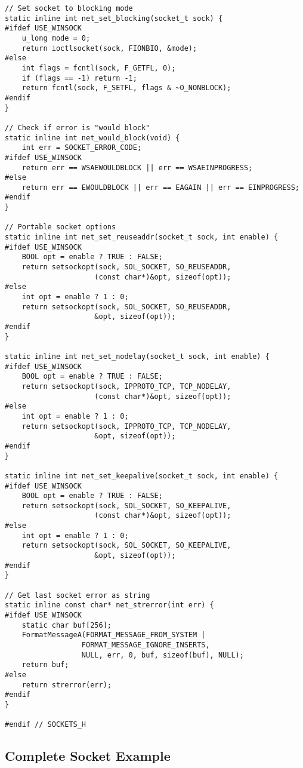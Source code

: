 \begin{lstlisting}
// Set socket to blocking mode
static inline int net_set_blocking(socket_t sock) {
#ifdef USE_WINSOCK
    u_long mode = 0;
    return ioctlsocket(sock, FIONBIO, &mode);
#else
    int flags = fcntl(sock, F_GETFL, 0);
    if (flags == -1) return -1;
    return fcntl(sock, F_SETFL, flags & ~O_NONBLOCK);
#endif
}

// Check if error is "would block"
static inline int net_would_block(void) {
    int err = SOCKET_ERROR_CODE;
#ifdef USE_WINSOCK
    return err == WSAEWOULDBLOCK || err == WSAEINPROGRESS;
#else
    return err == EWOULDBLOCK || err == EAGAIN || err == EINPROGRESS;
#endif
}

// Portable socket options
static inline int net_set_reuseaddr(socket_t sock, int enable) {
#ifdef USE_WINSOCK
    BOOL opt = enable ? TRUE : FALSE;
    return setsockopt(sock, SOL_SOCKET, SO_REUSEADDR,
                     (const char*)&opt, sizeof(opt));
#else
    int opt = enable ? 1 : 0;
    return setsockopt(sock, SOL_SOCKET, SO_REUSEADDR,
                     &opt, sizeof(opt));
#endif
}

static inline int net_set_nodelay(socket_t sock, int enable) {
#ifdef USE_WINSOCK
    BOOL opt = enable ? TRUE : FALSE;
    return setsockopt(sock, IPPROTO_TCP, TCP_NODELAY,
                     (const char*)&opt, sizeof(opt));
#else
    int opt = enable ? 1 : 0;
    return setsockopt(sock, IPPROTO_TCP, TCP_NODELAY,
                     &opt, sizeof(opt));
#endif
}

static inline int net_set_keepalive(socket_t sock, int enable) {
#ifdef USE_WINSOCK
    BOOL opt = enable ? TRUE : FALSE;
    return setsockopt(sock, SOL_SOCKET, SO_KEEPALIVE,
                     (const char*)&opt, sizeof(opt));
#else
    int opt = enable ? 1 : 0;
    return setsockopt(sock, SOL_SOCKET, SO_KEEPALIVE,
                     &opt, sizeof(opt));
#endif
}

// Get last socket error as string
static inline const char* net_strerror(int err) {
#ifdef USE_WINSOCK
    static char buf[256];
    FormatMessageA(FORMAT_MESSAGE_FROM_SYSTEM |
                  FORMAT_MESSAGE_IGNORE_INSERTS,
                  NULL, err, 0, buf, sizeof(buf), NULL);
    return buf;
#else
    return strerror(err);
#endif
}

#endif // SOCKETS_H
\end{lstlisting}

\subsection{Complete Socket Example}

